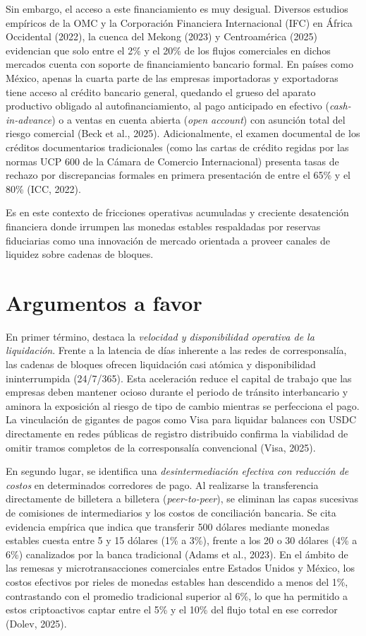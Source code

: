 \documentclass[spanish,11pt]{article}
\begin{document}
Sin embargo, el acceso a este financiamiento es muy desigual. Diversos estudios empíricos de la OMC y la Corporación 
Financiera Internacional (IFC) en África Occidental (2022), la cuenca del Mekong (2023) y Centroamérica (2025) evidencian 
que solo entre el 2\% y el 20\% de los flujos comerciales en dichos mercados cuenta con soporte de financiamiento bancario formal. 
En países como México, apenas la cuarta parte de las empresas importadoras y exportadoras tiene acceso al crédito bancario general,
quedando el grueso del aparato productivo obligado al autofinanciamiento, al pago anticipado en efectivo (\emph{cash-in-advance}) 
o a ventas en cuenta abierta (\emph{open account}) con asunción total del riesgo comercial (Beck et al., 2025). Adicionalmente, 
el examen documental de los créditos documentarios tradicionales (como las cartas de crédito regidas por las normas UCP 600 de 
la Cámara de Comercio Internacional) presenta tasas de rechazo por discrepancias formales en primera presentación de entre 
el 65\% y el 80\% (ICC, 2022).

Es en este contexto de fricciones operativas acumuladas y creciente desatención financiera donde 
irrumpen las monedas estables respaldadas por reservas fiduciarias como una innovación de mercado orientada a 
proveer canales de liquidez sobre cadenas de bloques.

\section{Argumentos a favor}\label{argumentos-a-favor}

En primer término, destaca la \emph{velocidad y disponibilidad operativa de la liquidación}. Frente a la latencia 
de días inherente a las redes de corresponsalía, las cadenas de bloques ofrecen liquidación casi atómica 
y disponibilidad ininterrumpida (24/7/365). Esta aceleración reduce el capital de trabajo que las empresas deben mantener 
ocioso durante el periodo de tránsito interbancario y aminora la exposición al riesgo de tipo de cambio mientras se perfecciona el 
pago. La vinculación de gigantes de pagos como Visa para liquidar balances con USDC directamente en redes públicas de registro 
distribuido confirma la viabilidad de omitir tramos completos de la corresponsalía convencional (Visa, 2025).

En segundo lugar, se identifica una \emph{desintermediación efectiva con reducción de costos} en determinados 
corredores de pago. Al realizarse la transferencia directamente de billetera a billetera (\emph{peer-to-peer}), 
se eliminan las capas sucesivas de comisiones de intermediarios y los costos de conciliación bancaria. 
Se cita evidencia empírica que indica que transferir 500 dólares mediante monedas estables cuesta entre 5 y 15 dólares (1\% a 3\%), 
frente a los 20 o 30 dólares (4\% a 6\%) canalizados por la banca tradicional (Adams et al., 2023). En el ámbito de las 
remesas y microtransacciones comerciales entre Estados Unidos y México, los costos efectivos por rieles de monedas estables
han descendido a menos del 1\%, contrastando con el promedio tradicional superior al 6\%, lo que ha permitido a estos 
criptoactivos captar entre el 5\% y el 10\% del flujo total en ese corredor (Dolev, 2025).
\end{document}
